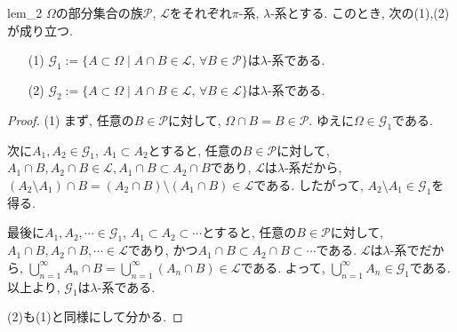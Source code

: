 \begin{lemma}{}{lem_2}
    $\Omega$の部分集合の族$\mathcal{P}$, $\mathcal{L}$をそれぞれ$\pi$-系, $\lambda$-系とする.
    このとき, 次の(1),(2)が成り立つ.
    \begin{itemize}
        \item[(1)] $\mathcal{G}_1:=\{A\subset\Omega\mid A\cap B\in\mathcal{L},\,\forall B\in\mathcal{P}\}$は$\lambda$-系である.
        \item[(2)] $\mathcal{G}_2:=\{A\subset\Omega\mid A\cap B\in\mathcal{L},\,\forall B\in\mathcal{L}\}$は$\lambda$-系である.
    \end{itemize}
\end{lemma}
\begin{proof}
    (1) まず, 任意の$B\in\mathcal{P}$に対して, $\Omega\cap B=B\in \mathcal{P}$.
    ゆえに$\Omega\in\mathcal{G}_1$である.

    次に$A_1,A_2\in\mathcal{G}_1$, $A_1\subset A_2$とすると, 任意の$B\in\mathcal{P}$に対して, $A_1\cap B,A_2\cap B\in\mathcal{L},A_1\cap B\subset A_2\cap B$であり, $\mathcal{L}$は$\lambda$-系だから, $(A_2\setminus A_1)\cap B=(A_2\cap B)\setminus(A_1\cap B)\in \mathcal{L}$である.
    したがって, $A_2\setminus A_1\in \mathcal{G}_1$を得る.

    最後に$A_1,A_2,\cdots\in\mathcal{G}_1$, $A_1\subset A_2\subset \cdots$とすると, 任意の$B\in\mathcal{P}$に対して, $A_1\cap B,A_2\cap B,\cdots\in\mathcal{L}$であり, かつ$A_1\cap B\subset A_2\cap B\subset\cdots$である.
    $\mathcal{L}$は$\lambda$-系でだから, $\bigcup_{n=1}^\infty A_n \cap B=\bigcup_{n=1}^\infty(A_n\cap B)\in\mathcal{L}$である.
    よって, $\bigcup_{n=1}^\infty A_n\in \mathcal{G}_1$である.
    以上より, $\mathcal{G}_1$は$\lambda$-系である.

    (2)も(1)と同様にして分かる.
\end{proof}


